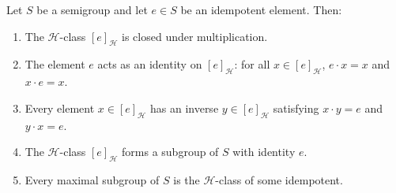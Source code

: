\begin{lemma}
\label{lem:hclass-subgroup}
Let $S$ be a semigroup and let $e \in S$ be an idempotent element. Then:
\begin{enumerate}
    \item The $\mathcal{H}$-class $[e]_{\mathcal{H}}$ is closed under multiplication.
    \item The element $e$ acts as an identity on $[e]_{\mathcal{H}}$: for all $x \in [e]_{\mathcal{H}}$, $e \cdot x = x$ and $x \cdot e = x$.
    \item Every element $x \in [e]_{\mathcal{H}}$ has an inverse $y \in [e]_{\mathcal{H}}$ satisfying $x \cdot y = e$ and $y \cdot x = e$.
    \item The $\mathcal{H}$-class $[e]_{\mathcal{H}}$ forms a subgroup of $S$ with identity $e$.
    \item Every maximal subgroup of $S$ is the $\mathcal{H}$-class of some idempotent.
\end{enumerate}
\leanok
{}
\end{lemma}

